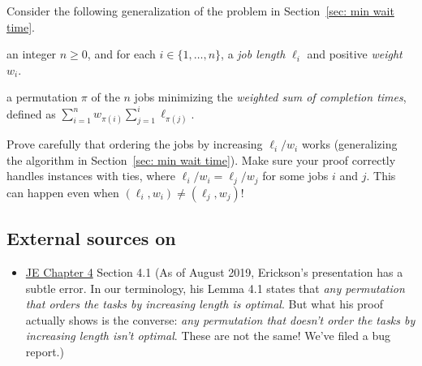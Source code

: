 \exercise\label{exercise: min wait time}
Consider the following generalization of the problem in Section~\ref{sec: min wait time}.
\begin{mylist}
\item[\bf input:] an integer $n\ge 0$, and for each $i\in\{1,\ldots,n\}$,
  a \emph{job length} $\ell_i$ and positive \emph{weight} $w_i$.
\item[\bf output:] a permutation $\pi$ of the $n$ jobs minimizing the \emph{weighted sum of completion times},
  defined as $\sum_{i=1}^n w_{\pi(i)} \sum_{j=1}^i \ell_{\pi(j)}$.
\end{mylist}
Prove carefully that ordering the jobs by increasing $\ell_i/w_i$ works
(generalizing the algorithm in Section~\ref{sec: min wait time}).
Make sure your proof correctly handles instances with ties, where $\ell_i/w_i = \ell_j/w_j$ for some jobs $i$ and $j$.  This can happen even when $(\ell_i, w_i) \ne (\ell_j, w_j)$!


\subsection{External sources on }

\begin{itemize}
\item 
  \href{http://jeffe.cs.illinois.edu/teaching/algorithms/book/04-greedy.pdf}{JE Chapter 4} Section 4.1
  (As of August 2019,
  Erickson's presentation has a subtle error.
  In our terminology, his Lemma 4.1 states that
  \emph{any permutation that orders the tasks by increasing length is optimal}.
  But what his proof actually shows is the converse:
  \emph{any permutation that doesn't order the tasks by increasing length isn't optimal}.
  These are not the same!  We've filed a bug report.)
  
\end{itemize}



